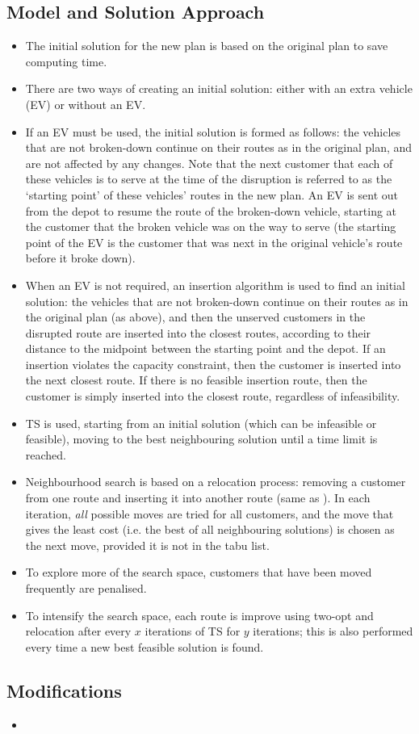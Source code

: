\documentclass[a4paper]{article}
\begin{document}
\subsection{Model and Solution Approach}
\begin{itemize}[label=\textcolor{myYellow}{\textbullet},leftmargin=*,itemsep=-0.1em]
	\item The initial solution for the new plan is based on the original plan to save computing time.
	\item There are two ways of creating an initial solution: either with an extra vehicle (EV) or without an EV.
	\item If an EV must be used, the initial solution is formed as follows: the vehicles that are not broken-down continue on their routes as in the original plan, and are not affected by any changes. Note that the next customer that each of these vehicles is to serve at the time of the disruption is referred to as the `starting point' of these vehicles' routes in the new plan. An EV is sent out from the depot to resume the route of the broken-down vehicle, starting at the customer that the broken vehicle was on the way to serve (the starting point of the EV is the customer that was next in the original vehicle's route before it broke down).
	\item When an EV is not required, an insertion algorithm is used to find an initial solution: the vehicles that are not broken-down continue on their routes as in the original plan (as above), and then the unserved customers in the disrupted route are inserted into the closest routes, according to their distance to the midpoint between the starting point and the depot. If an insertion violates the capacity constraint, then the customer is inserted into the next closest route. If there is no feasible insertion route, then the customer is simply inserted into the closest route, regardless of infeasibility.
	\item TS is used, starting from an initial solution (which can be infeasible or feasible), moving to the best neighbouring solution until a time limit is reached.
	\item Neighbourhood search is based on a relocation process: removing a customer from one route and inserting it into another route (same as \citet{yuan2017}). In each iteration, \emph{all} possible moves are tried for all customers, and the move that gives the least cost (i.e. the best of all neighbouring solutions) is chosen as the next move, provided it is not in the tabu list.
	\item To explore more of the search space, customers that have been moved frequently are penalised.
	\item To intensify the search space, each route is improve using two-opt and relocation after every $x$ iterations of TS for $y$ iterations; this is also performed every time a new best feasible solution is found.
\end{itemize}	

\subsection{Modifications}
\begin{itemize}[label=\textcolor{myYellow}{\textbullet},leftmargin=*,itemsep=-0.1em]
	\item 
\end{itemize}



\end{document}
